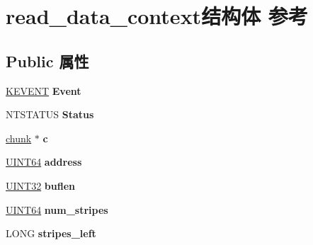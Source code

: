 \hypertarget{structread__data__context}{}\section{read\+\_\+data\+\_\+context结构体 参考}
\label{structread__data__context}
\subsection*{Public 属性}
\begin{DoxyCompactItemize}
\item 
\mbox{\label{structread__data__context_ac2370079bf5cfa209347acfdd0a1f42a}} 
\hyperlink{struct___k_e_v_e_n_t}{K\+E\+V\+E\+NT} {\bfseries Event}
\item 
\mbox{\label{structread__data__context_aae0583ed63fc447616354c6ebbe8b54a}} 
N\+T\+S\+T\+A\+T\+US {\bfseries Status}
\item 
\mbox{\label{structread__data__context_a1a4c235b273b5439f1f0fbee5b6901f7}} 
\hyperlink{structchunk}{chunk} $\ast$ {\bfseries c}
\item 
\mbox{\label{structread__data__context_ae8b6ce3199991e88745561598a0a3d7d}} 
\hyperlink{_processor_bind_8h_a57be03562867144161c1bfee95ca8f7c}{U\+I\+N\+T64} {\bfseries address}
\item 
\mbox{\label{structread__data__context_aaea7b97f847a5edacb9669410435ed95}} 
\hyperlink{_processor_bind_8h_ae1e6edbbc26d6fbc71a90190d0266018}{U\+I\+N\+T32} {\bfseries buflen}
\item 
\mbox{\label{structread__data__context_a5a1fb38fdbab8df5caf7334be456ddf5}} 
\hyperlink{_processor_bind_8h_a57be03562867144161c1bfee95ca8f7c}{U\+I\+N\+T64} {\bfseries num\+\_\+stripes}
\item 
\mbox{\label{structread__data__context_a8a98be7d3dcb40bb4eff756cf9cc9a70}} 
L\+O\+NG {\bfseries stripes\+\_\+left}
\item 
\mbox{\label{structread__data__context_a2b599ec9ac63ba5020327cd7ffbaffcb}} 

\end{DoxyCompactItemize}
